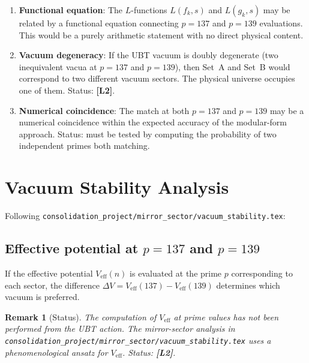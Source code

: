 \documentclass[11pt,a4paper]{article}
\newtheorem{remark}{Remark}
\begin{document}
\begin{enumerate}
  \item \textbf{Functional equation}: The $L$-functions $L(f_k, s)$ and
    $L(g_k, s)$ may be related by a functional equation connecting
    $p = 137$ and $p = 139$ evaluations.  This would be a purely arithmetic
    statement with no direct physical content.

  \item \textbf{Vacuum degeneracy}: If the UBT vacuum is doubly degenerate
    (two inequivalent vacua at $p = 137$ and $p = 139$), then Set~A and
    Set~B would correspond to two different vacuum sectors.  The physical
    universe occupies one of them.  Status: \textbf{[L2]}.

  \item \textbf{Numerical coincidence}: The match at both $p = 137$ and
    $p = 139$ may be a numerical coincidence within the expected accuracy
    of the modular-form approach.  Status: must be tested by computing
    the probability of two independent primes both matching.
\end{enumerate}

\section{Vacuum Stability Analysis}
\label{sec:vacuum}

Following \texttt{consolidation\_project/mirror\_sector/vacuum\_stability.tex}:

\subsection{Effective potential at $p = 137$ and $p = 139$}

If the effective potential $V_{\mathrm{eff}}(n)$ is evaluated at the
prime $p$ corresponding to each sector, the difference
$\Delta V = V_{\mathrm{eff}}(137) - V_{\mathrm{eff}}(139)$ determines
which vacuum is preferred.

\begin{remark}[Status]
  The computation of $V_{\mathrm{eff}}$ at prime values has not been
  performed from the UBT action.  The mirror-sector analysis in
  \texttt{consolidation\_project/mirror\_sector/vacuum\_stability.tex}
  uses a phenomenological ansatz for $V_{\mathrm{eff}}$.
  Status: \textbf{[L2]}.
\end{remark}
\end{document}
